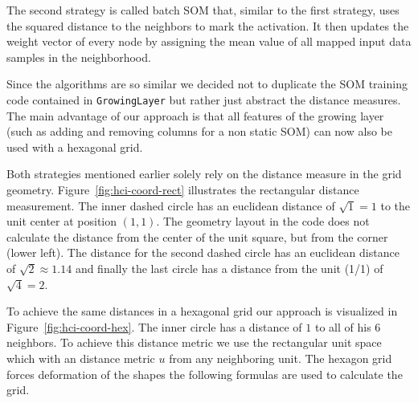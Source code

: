 \documentclass{acm_proc_article-sp}
\begin{document}
The second strategy is called batch SOM that, similar to the first strategy, uses the squared distance to the neighbors
to mark the activation. It then updates the weight vector of every node by assigning the mean value of all mapped input
data samples in the neighborhood.

Since the algorithms are so similar we decided not to duplicate the SOM training code contained in \lstinline!GrowingLayer! but
rather just abstract the distance measures. The main advantage of our approach is that all features of the growing layer (such as adding and removing columns for a non static SOM) can now also be used with a hexagonal grid.

Both strategies mentioned earlier solely rely on the distance measure in the grid geometry.
Figure~\ref{fig:hci-coord-rect} illustrates the rectangular distance measurement.
The inner dashed circle has an euclidean distance of $\sqrt{1} = 1$ to
the unit center at position $(1,1)$. The geometry layout in the code does not calculate the distance from the center of
the unit square, but from the corner (lower left). The distance for the second dashed circle has an euclidean distance of $\sqrt{2} \approx 1.14$ and finally the last circle has a distance from the unit (1/1) of $\sqrt{4} = 2$.

To achieve the same distances in a hexagonal grid our approach is visualized in Figure~\ref{fig:hci-coord-hex}.
The inner circle has a distance of $1$ to all of his 6 neighbors. To achieve this distance metric 
we use the rectangular unit space which with an distance metric $u$ from any neighboring unit. The hexagon grid forces deformation
of the shapes the following formulas are used to calculate the grid.
\end{document}
